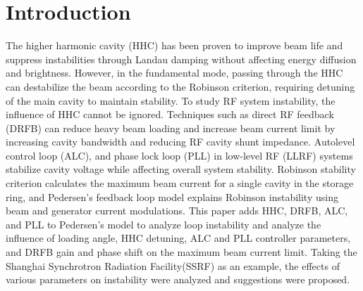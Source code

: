 \documentclass[letterpaper,
               nospread,     %
               ]{jacow}
\begin{document}
\section{Introduction}
The higher harmonic cavity (HHC) has been proven to improve beam
life and suppress instabilities through Landau damping without
affecting energy diffusion and brightness\cite{ref1}\cite{ref2}.
However, in the fundamental mode, passing through the HHC can
destabilize the beam according to the Robinson criterion,
requiring detuning of the main cavity to maintain stability\cite{ref3}.
To study RF system instability, the influence of HHC cannot be ignored.
Techniques such as direct RF feedback (DRFB) can reduce heavy
beam loading and increase beam current limit by increasing cavity
bandwidth and reducing RF cavity shunt impedance\cite{ref4}.
Autolevel control loop (ALC), and phase lock loop (PLL) in
low-level RF (LLRF) systems stabilize cavity voltage while
affecting overall system stability. Robinson stability criterion
calculates the maximum beam current for a single cavity in the
storage ring\cite{ref5}, and Pedersen's feedback loop model
explains Robinson instability using beam and generator current modulations\cite{ref6}.
This paper adds HHC, DRFB, ALC, and PLL to Pedersen's model to
analyze loop instability and analyze the influence of loading angle,
HHC detuning, ALC and PLL controller parameters, and DRFB gain and
phase shift on the maximum beam current limit. Taking the Shanghai
Synchrotron Radiation Facility(SSRF) as an example, the effects
of various parameters on instability were analyzed and suggestions were proposed.
\end{document}
